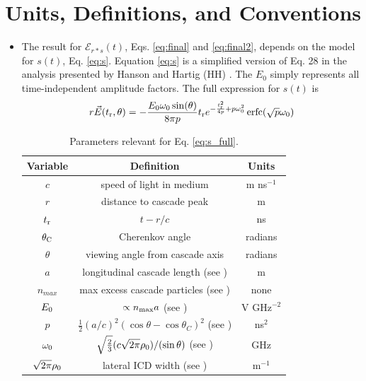 \documentclass[amsmath,amssymb,aps,prd,10pt,twocolumn,showkeys]{revtex4}
\DeclareMathOperator\erfc{erfc}
\begin{document}
\section{Units, Definitions, and Conventions}
\label{sec:unit}

\begin{itemize}
\item The result for $\mathcal{E}_{r*s}(t)$, Eqs. \ref{eq:final} and \ref{eq:final2}, depends on the model for $s(t)$, Eq. \ref{eq:s}.  Equation \ref{eq:s} is a simplified version of Eq. 28 in the analysis presented by Hanson and Hartig (HH) \cite{PhysRevD.105.123019}.  The $E_0$ simply represents all time-independent amplitude factors.  The full expression for $s(t)$ is
\begin{equation}
r\vec{E}(t_{\rm r},\theta) = -\frac{E_0\omega_0 \sin(\theta)}{8\pi p}t_{\rm r}e^{-\frac{t_{\rm r}^2}{4p}+p\omega_0^2}\erfc(\sqrt{p}\omega_0) \label{eq:s_full}
\end{equation}
\begin{table}
\begin{tabular}{| c | c | c |} \hline
\textbf{Variable} & \textbf{Definition} & \textbf{Units}\\ \hline
$c$ & speed of light in medium & m ns$^{-1}$ \\ 
$r$ & distance to cascade peak & m \\
$t_{\rm r}$ & $t-r/c$ & ns \\
$\theta_{\rm C}$ & Cherenkov angle & radians \\ 
$\theta$ & viewing angle from cascade axis & radians \\ 
$a$ & longitudinal cascade length (see \cite{10.1103/physrevd.65.016003}) & m \\ 
$n_{max}$ & max excess cascade particles (see \cite{10.1103/physrevd.65.016003})  & none \\
$E_{\rm 0}$ & $\propto n_{\rm max}a$ (see \cite{10.1103/physrevd.65.016003}) & V GHz$^{-2}$ \\
$p$ & $\frac{1}{2}(a/c)^2 \left(\cos\theta - \cos\theta_C\right)^2$ (see \cite{PhysRevD.105.123019}) & ns$^2$ \\ 
$\omega_{\rm 0}$ & $\sqrt{\frac{2}{3}} (c\sqrt{2\pi}\rho_{\rm 0})/(\sin\theta)$ (see \cite{10.1016/j.astropartphys.2017.03.008}) & GHz \\
$\sqrt{2\pi}\rho_{\rm 0}$ & lateral ICD width (see \cite{10.1016/j.astropartphys.2017.03.008}) & m$^{-1}$ \\ \hline
\end{tabular}
\caption{\label{tab:param} Parameters relevant for Eq. \ref{eq:s_full}.}
\end{table}


\end{itemize}
\end{document}

